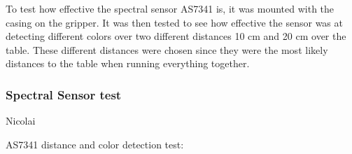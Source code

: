 To test how effective the spectral sensor AS7341 is, it was mounted with the casing on the gripper. It was then tested to see how effective the sensor was at detecting different colors over two different distances 10 cm and 20 cm over the table. These different distances were chosen since they were the most likely distances to the table when running everything together.

\subsubsection{Spectral Sensor test}
Nicolai

AS7341 distance and color detection test:


\begin{table}[H]
\centering
\caption{10 cm to table and 6 cm to block ($t_{int} = 41.7$ ms)}

\end{table}

\begin{table}[H]
\centering
\caption{20 cm to table and 16 cm to block ($t_{int} = 41.7$ ms)}

\end{table}

